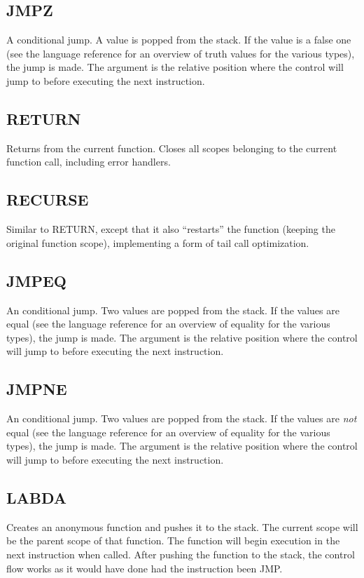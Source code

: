 \subsection{JMPZ}
\label{sec:jmpz}
A conditional jump. A value is popped from the stack. If the value is
a false one (see the language reference for an overview of truth values
for the various types), the jump is made. The argument is the relative
position where the control will jump to before executing the next
instruction.

\subsection{RETURN}
\label{sec:return}
Returns from the current function. Closes all scopes belonging to the
current function call, including error handlers.

\subsection{RECURSE}
\label{sec:recurse}
Similar to RETURN, except that it also ``restarts'' the function
(keeping the original function scope), implementing a form of tail call
optimization.

\subsection{JMPEQ}
\label{sec:jmpeq}
An conditional jump. Two values are popped from the stack. If the values
are equal (see the language reference for an overview of equality for
the various types), the jump is made. The argument is the relative
position where the control will jump to before executing the next
instruction.

\subsection{JMPNE}
\label{sec:jmpne}
An conditional jump. Two values are popped from the stack. If the values
are \emph{not} equal (see the language reference for an overview of
equality for the various types), the jump is made. The argument is the
relative position where the control will jump to before executing the
next instruction.

\subsection{LABDA}
\label{sec:labda}
Creates an anonymous function and pushes it to the stack. The current
scope will be the parent scope of that function. The function will begin
execution in the next instruction when called. After pushing the
function to the stack, the control flow works as it would have done had
the instruction been JMP.

